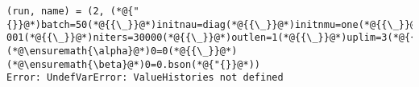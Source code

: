 \documentclass[12pt,a4paper]{article}
\begin{document}
\begin{lstlisting}
(run, name) = (2, (*@{"{}}@*)batch=50(*@{{\_}}@*)initnau=diag(*@{{\_}}@*)initnmu=one(*@{{\_}}@*)inlen=4(*@{{\_}}@*)lowlim=1(*@{{\_}}@*)lr=0.
001(*@{{\_}}@*)niters=30000(*@{{\_}}@*)outlen=1(*@{{\_}}@*)uplim=3(*@{{\_}}@*)(*@\ensuremath{\alpha}@*)0=0(*@{{\_}}@*)(*@\ensuremath{\beta}@*)0=0.bson(*@{"{}}@*))
Error: UndefVarError: ValueHistories not defined
\end{lstlisting}
\end{document}
